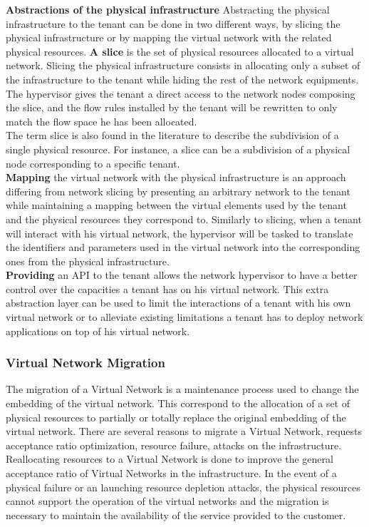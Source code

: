 \textbf{Abstractions of the physical infrastructure}
Abstracting the physical infrastructure to the tenant can be done in two different ways, by slicing the physical infrastructure or by mapping the virtual network with the related physical resources.
\textbf{A slice} is the set of physical resources allocated to a virtual network.
Slicing the physical infrastructure consists in allocating only a subset of the infrastructure to the tenant while hiding the rest of the network equipments.
The hypervisor gives the tenant a direct access to the network nodes composing the slice, and the flow rules installed by the tenant will be rewritten to only match the flow space he has been allocated.\\
The term slice is also found in the literature to describe the subdivision of a single physical resource. For instance, a slice can be a subdivision of a physical node corresponding to a specific tenant.\\
\textbf{Mapping} the virtual network with the physical infrastructure is an approach differing from network slicing by presenting an arbitrary network to the tenant while maintaining a mapping between the virtual elements used by the tenant and the physical resources they correspond to.
Similarly to slicing, when a tenant will interact with his virtual network, the hypervisor will be tasked to translate the identifiers and parameters used in the virtual network into the corresponding ones from the physical infrastructure.\\
\textbf{Providing} an API to the tenant allows the network hypervisor to have a better control over the capacities a tenant has on his virtual network. This extra abstraction layer can be used to limit the interactions of a tenant with his own virtual network or to alleviate existing limitations a tenant has to deploy network applications on top of his virtual network. 



\subsubsection{Virtual Network Migration}
The migration of a Virtual Network is a maintenance process used to change the embedding of the virtual network. 
This correspond to the allocation of a set of physical resources to partially or totally replace the original embedding of the virtual network.
There are several reasons to migrate a Virtual Network, requests acceptance ratio optimization, resource failure, attacks on the infrastructure.
Reallocating resources to a Virtual Network is done to improve the general acceptance ratio of Virtual Networks in the infrastructure.
In the event of a physical failure or an launching resource depletion attacks, the physical resources cannot support the operation of the virtual networks and the migration is necessary to maintain the availability of the service provided to the customer.

